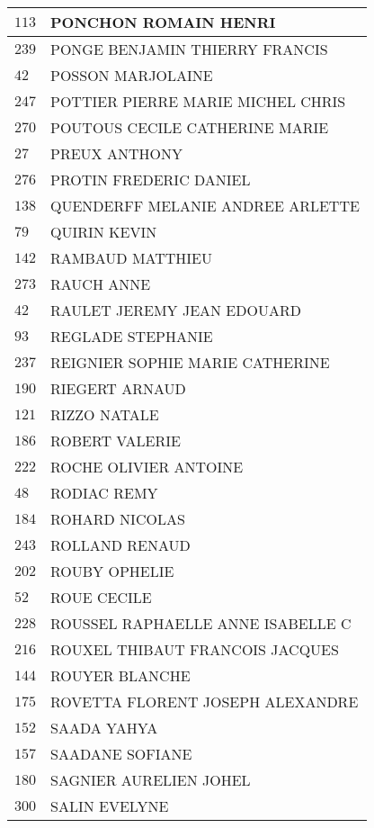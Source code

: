 \begin{xltabular}{\linewidth}{|l|X|}
    $113$ & PONCHON ROMAIN HENRI \\
    \hline
    $239$ & PONGE BENJAMIN THIERRY FRANCIS \\
    \hline
    $42$ & POSSON MARJOLAINE \\
    \hline
    $247$ & POTTIER PIERRE MARIE MICHEL CHRIS \\
    \hline
    $270$ & POUTOUS CECILE CATHERINE MARIE \\
    \hline
    $27$ & PREUX ANTHONY \\
    \hline
    $276$ & PROTIN FREDERIC DANIEL \\
    \hline
    $138$ & QUENDERFF MELANIE ANDREE ARLETTE \\
    \hline
    $79$ & QUIRIN KEVIN \\
    \hline
    $142$ & RAMBAUD MATTHIEU \\
    \hline
    $273$ & RAUCH ANNE \\
    \hline
    $42$ & RAULET JEREMY JEAN EDOUARD \\
    \hline
    $93$ & REGLADE STEPHANIE \\
    \hline
    $237$ & REIGNIER SOPHIE MARIE CATHERINE \\
    \hline
    $190$ & RIEGERT ARNAUD \\
    \hline
    $121$ & RIZZO NATALE \\
    \hline
    $186$ & ROBERT VALERIE \\
    \hline
    $222$ & ROCHE OLIVIER ANTOINE \\
    \hline
    $48$ & RODIAC REMY \\
    \hline
    $184$ & ROHARD NICOLAS \\
    \hline
    $243$ & ROLLAND RENAUD \\
    \hline
    $202$ & ROUBY OPHELIE \\
    \hline
    $52$ & ROUE CECILE \\
    \hline
    $228$ & ROUSSEL RAPHAELLE ANNE ISABELLE C \\
    \hline
    $216$ & ROUXEL THIBAUT FRANCOIS JACQUES \\
    \hline
    $144$ & ROUYER BLANCHE \\
    \hline
    $175$ & ROVETTA FLORENT JOSEPH ALEXANDRE \\
    \hline
    $152$ & SAADA YAHYA \\
    \hline
    $157$ & SAADANE SOFIANE \\
    \hline
    $180$ & SAGNIER AURELIEN JOHEL \\
    \hline
    $300$ & SALIN EVELYNE \\

\end{xltabular}
